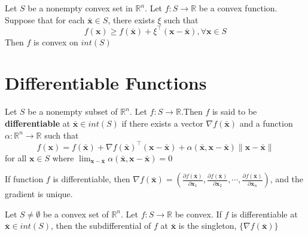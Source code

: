 				\begin{theorem}
					Let $S$ be a nonempty convex set in $\mathbb{R}^n$. Let $f: S\rightarrow \mathbb{R}$ be a convex function. Suppose that for each $\bar{\mathbf{x}} \in S$, there exists $\xi$ such that
					\begin{equation}
					 	f(\mathbf{x}) \ge f(\bar{\mathbf{x}}) + \xi^\top(\mathbf{x} - \bar{\mathbf{x}}), \forall \mathbf{x} \in S
					\end{equation} 
					Then $f$ is convex on $int(S)$
				\end{theorem}


			\section{Differentiable Functions}
				\begin{definition}
				 	Let $S$ be a nonempty subset of $\mathbb{R}^n$. Let $f: S\rightarrow \mathbb{R}$.Then $f$ is said to be \textbf{differentiable} at $\bar{\mathbf{x}} \in int(S)$ if there exists a vector $\nabla f(\bar{\mathbf{x}})$ and a function $\alpha: \mathbb{R}^n \rightarrow \mathbb{R}$ such that
				 	\begin{equation}
				 		f(\mathbf{x}) = f(\bar{\mathbf{x}}) + \nabla f(\bar{\mathbf{x}})^\top (\mathbf{x} - \bar{\mathbf{x}}) + \alpha(\bar{\mathbf{x}}, \mathbf{x} - \bar{\mathbf{x}})\|\mathbf{x} - \bar{\mathbf{x}}\|
				 	\end{equation}
				 	for all $\mathbf{x} \in S$ where $\lim_{\mathbf{x} - \bar{\mathbf{x}}}\alpha (\bar{\mathbf{x}}, \mathbf{x} - \bar{\mathbf{x}}) = 0$
				\end{definition}

				\begin{remark}
				 	If function $f$ is differentiable, then $\nabla f(\bar{\mathbf{x}}) = (\frac{\partial f(\bar{\mathbf{x}})}{\partial \mathbf{x}_1}, \frac{\partial f(\bar{\mathbf{x}})}{\partial \mathbf{x}_2}, \cdots, \frac{\partial f(\bar{\mathbf{x}})}{\partial \mathbf{x}_n})$, and the gradient is unique.
				\end{remark}

				\begin{lemma}
					Let $S\neq \emptyset$ be a convex set of $\mathbb{R}^n$. Let $f: S\rightarrow \mathbb{R}$ be convex. If $f$ is differentiable at $\bar{\mathbf{x}} \in int(S)$, then the subdifferential of $f$ at $\bar{\mathbf{x}}$ is the singleton, $\{\nabla f(\bar{\mathbf{x}})\}$
				\end{lemma}

